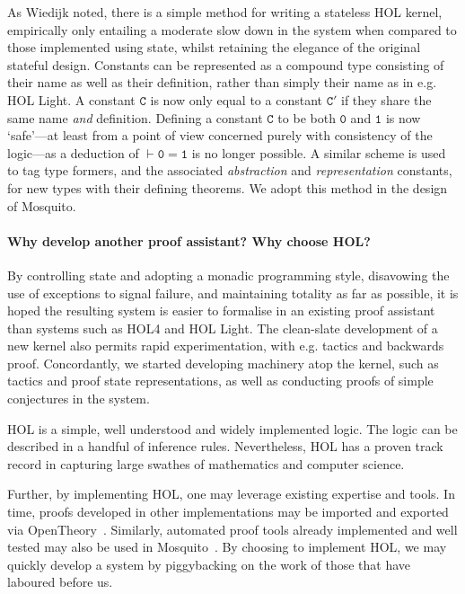 \documentclass{llncs}
\newcommand{\mosquito}{Mosquito\xspace}
\begin{document}
As Wiedijk noted, there is a simple method for writing a stateless HOL kernel, empirically only entailing a moderate slow down in the system when compared to those implemented using state, whilst retaining the elegance of the original stateful design.
Constants can be represented as a compound type consisting of their name as well as their definition, rather than simply their name as in e.g. HOL Light.
A constant $\mathtt{C}$ is now only equal to a constant $\mathtt{C'}$ if they share the same name \emph{and} definition.
Defining a constant $\mathtt{C}$ to be both $\mathtt{0}$ and $\mathtt{1}$ is now `safe'---at least from a point of view concerned purely with consistency of the logic---as a deduction of $\vdash \mathtt{0 = 1}$ is no longer possible.
A similar scheme is used to tag type formers, and the associated \emph{abstraction} and \emph{representation} constants, for new types with their defining theorems.
We adopt this method in the design of \mosquito.

\paragraph{Why develop another proof assistant?  Why choose HOL?}
By controlling state and adopting a monadic programming style, disavowing the use of exceptions to signal failure, and maintaining totality as far as possible, it is hoped the resulting system is easier to formalise in an existing proof assistant than systems such as HOL4 and HOL Light.
The clean-slate development of a new kernel also permits rapid experimentation, with e.g. tactics and backwards proof.
Concordantly, we started developing machinery atop the kernel, such as tactics and proof state representations, as well as conducting proofs of simple conjectures in the system.

HOL is a simple, well understood and widely implemented logic.
The logic can be described in a handful of inference rules.
Nevertheless, HOL has a proven track record in capturing large swathes of mathematics and computer science.

Further, by implementing HOL, one may leverage existing expertise and tools.
In time, proofs developed in other implementations may be imported and exported via OpenTheory~\cite{hurd:opentheory:2011}.
Similarly, automated proof tools already implemented and well tested may also be used in \mosquito~\cite{kumar:standalone:2012}.
By choosing to implement HOL, we may quickly develop a system by piggybacking on the work of those that have laboured before us.
\end{document}
